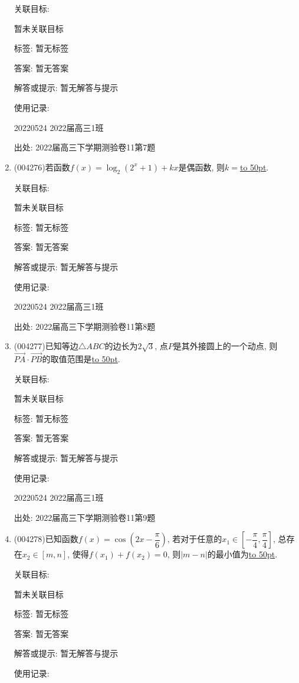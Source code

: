 \documentclass[10pt,a4paper]{article}
\newcommand{\blank}[1]{\underline{\hbox to #1pt{}}}
\begin{document}
\begin{enumerate}[1.]
关联目标:

暂未关联目标



标签: 暂无标签

答案: 暂无答案

解答或提示: 暂无解答与提示

使用记录:

20220524	2022届高三1班	


出处: 2022届高三下学期测验卷11第7题
\item { (004276)}若函数$f(x)=\log_2(2^x+1)+kx$是偶函数, 则$k=$\blank{50}.


关联目标:

暂未关联目标



标签: 暂无标签

答案: 暂无答案

解答或提示: 暂无解答与提示

使用记录:

20220524	2022届高三1班	


出处: 2022届高三下学期测验卷11第8题
\item { (004277)}已知等边$\triangle ABC$的边长为$2\sqrt{3}$, 点$P$是其外接圆上的一个动点, 则$\overrightarrow{PA}\cdot \overrightarrow{PB}$的取值范围是\blank{50}.


关联目标:

暂未关联目标



标签: 暂无标签

答案: 暂无答案

解答或提示: 暂无解答与提示

使用记录:

20220524	2022届高三1班	


出处: 2022届高三下学期测验卷11第9题
\item { (004278)}已知函数$f(x)=\cos (2x-\dfrac \pi 6)$, 若对于任意的$x_1\in [-\dfrac \pi 4,\dfrac\pi 4]$, 总存在$x_2\in [m,n]$, 使得$f(x_1)+f(x_2)=0$, 则$|m-n|$的最小值为\blank{50}.


关联目标:

暂未关联目标



标签: 暂无标签

答案: 暂无答案

解答或提示: 暂无解答与提示

使用记录:


\end{enumerate}
\end{document}

